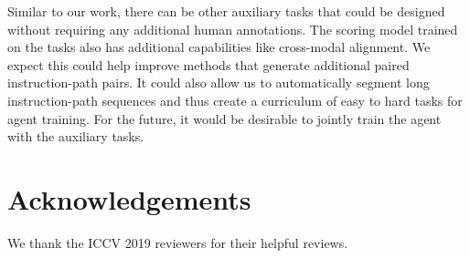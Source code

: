 \documentclass[10pt,twocolumn,letterpaper]{article}
\begin{document}
Similar to our work, there can be other auxiliary tasks that could be designed without requiring any additional human annotations. The scoring model trained on the tasks also has additional capabilities like cross-modal alignment. We expect this could help improve methods that generate additional paired instruction-path pairs. It could also allow us to automatically segment long instruction-path sequences and thus create a curriculum of easy to hard tasks for agent training. For the future, it would be desirable to jointly train the agent with the auxiliary tasks.

%
 
\section*{Acknowledgements}
\noindent
We thank the ICCV 2019 reviewers for their helpful reviews.
\end{document}

